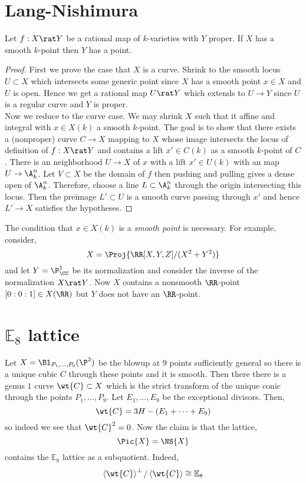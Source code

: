 \documentclass[12pt]{article}
\begin{document}
\section{Lang-Nishimura}

\begin{theorem}
Let $f : X \rat Y$  be a rational map of $k$-varieties with $Y$ proper. If $X$ has a smooth $k$-point then $Y$ has a point.
\end{theorem}

\begin{proof}
First we prove the case that $X$ is a curve. Shrink to the smooth locus $U \subset X$ which intersects some generic point since $X$ has a smooth point $x \in X$ and $U$ is open. Hence we get a rational map $U \rat Y$ which extends to $U \to Y$ since $U$ is a regular curve and $Y$ is proper. 
\bigskip\\
Now we reduce to the curve case. We may shrink $X$ such that it affine and integral with $x \in X(k)$ a smooth $k$-point. The goal is to show that there exists a (nonproper) curve $C \to X$ mapping to $X$ whose image intersects the locus of definition of $f : X \rat Y$ and contains a lift $x' \in C(k)$ as a smooth $k$-point of $C$. There is an \etale neighborhood $U \to X$ of $x$ with a lift $x' \in U(k)$ with an \etale map $U \to \A^n_k$. Let $V \subset X$ be the domain of $f$ then pushing and pulling gives a dense open of $\A^n_k$. Therefore, choose a line $L \subset \A^n_k$ through the origin intersecting this locus. Then the preimage $L' \subset U$ is a smooth curve passing through $x'$ and hence $L' \to X$ satisfies the hypotheses. 
\end{proof}

\begin{example}
The condition that $x \in X(k)$ is a \textit{smooth point} is necessary. For example, consider,
\[ X = \Proj{\RR[X,Y,Z]/(X^2 + Y^2)} \]
and let $Y = \P^1_{\CC}$ be its normalization and consider the inverse of the normalization $X \rat Y$. Now $X$ contains a nonsmooth $\RR$-point $[0:0:1] \in X(\RR)$ but $Y$ does not have an $\RR$-point. 
\end{example}

\newcommand{\bb}{\mathbb}

\section{$\bb{E}_8$ lattice}

Let $X = \Bl_{P_1, \dots, P_9}(\P^2)$ be the blowup at $9$ points sufficiently general so there is a unique cubic $C$ through these points and it is smooth. Then there there is a genus $1$ curve $\wt{C} \subset X$ which is the strict transform of the unique conic through the points $P_1, \dots, P_9$. Let $E_1, \dots, E_9$ be the exceptional divisors. Then,
\[ \wt{C} = 3 H - (E_1 + \cdots + E_9) \]
so indeed we see that $\wt{C}^2 = 0$. Now the claim is that the lattice,
\[ \Pic{X} = \NS{X} \]
contains the $\bb{E}_8$ lattice as a subquotient. Indeed,
\[ \left< \wt{C} \right>^\perp / \left< \wt{C} \right> \cong \bb{E}_8 \]
\end{document}
